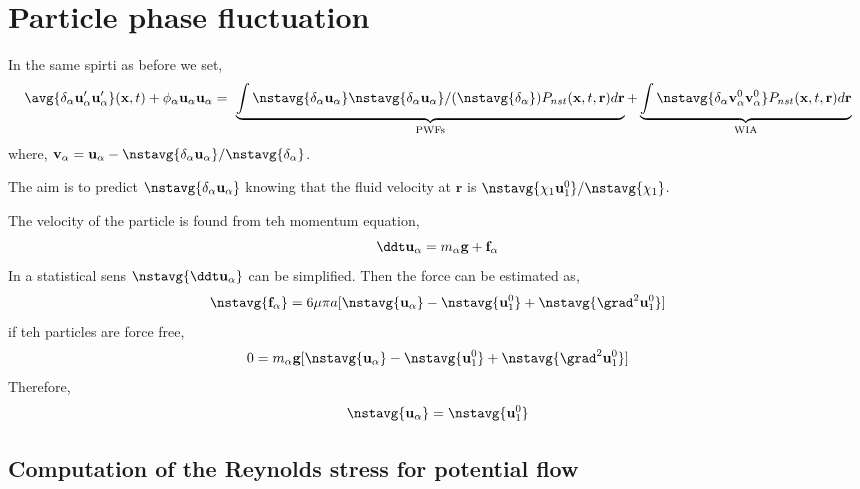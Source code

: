 \section*{Particle phase fluctuation}
In the same spirti as before we set, 
\begin{multline*}
    \avg{\delta_\alpha \textbf{u}'_\alpha\textbf{u}'_\alpha}(\textbf{x},t)
    + \phi_\alpha \textbf{u}_\alpha\textbf{u}_\alpha
    = \
    \underbrace{\int \nstavg{\delta_\alpha \textbf{u}_\alpha}  \nstavg{\delta_\alpha \textbf{u}_\alpha} / (\nstavg{\delta_\alpha})  P_{nst}(\textbf{x},t,\textbf{r}) d\textbf{r} }_\text{PWFs}
    +\underbrace{\int \nstavg{\delta_\alpha \textbf{v}_\alpha^0\textbf{v}_\alpha^0}  P_{nst}(\textbf{x},t,\textbf{r}) d\textbf{r}}_\text{WIA}
\end{multline*}
where, $\textbf{v}_\alpha = \textbf{u}_\alpha - \nstavg{\delta_\alpha \textbf{u}_\alpha}/\nstavg{\delta_\alpha}$. 

The aim is to predict $\nstavg{\delta_\alpha \textbf{u}_\alpha}$ knowing that the fluid velocity at $\textbf{r}$ is $\nstavg{\chi_1\textbf{u}^0_1}/\nstavg{\chi_1}$.

The velocity of the particle is found from teh momentum equation, 
\begin{equation*}
    \ddt \textbf{u}_\alpha
    = m_\alpha \textbf{g} + \textbf{f}_\alpha
\end{equation*}
In a statistical sens $\nstavg{\ddt \textbf{u}_\alpha}$ can be simplified. 
Then the force can be estimated as,
\begin{equation*}
    \nstavg{\textbf{f}_\alpha}
    = 6\mu \pi a 
    [\nstavg{\textbf{u}_\alpha} - \nstavg{\textbf{u}^0_1} + \nstavg{\grad^2 \textbf{u}_1^0}]
\end{equation*}
if teh particles are force free,
\begin{equation*}
    0
    = m_\alpha \textbf{g} 
    [\nstavg{\textbf{u}_\alpha} - \nstavg{\textbf{u}^0_1} + \nstavg{\grad^2 \textbf{u}_1^0}]
\end{equation*}
Therefore, 
\begin{equation*}
    \nstavg{\textbf{u}_\alpha} 
    =  \nstavg{\textbf{u}^0_1}
\end{equation*}

\subsection*{Computation of the Reynolds stress for potential flow }



